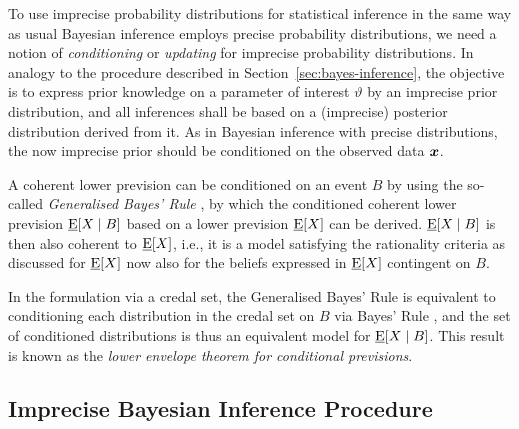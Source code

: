 To use imprecise probability distributions for statistical inference
in the same way as usual Bayesian inference employs precise probability distributions,
we need a notion of \emph{conditioning} or \emph{updating} for imprecise probability distributions.
In analogy to the procedure described in Section~\ref{sec:bayes-inference},
the objective is to express prior knowledge on a parameter of interest $\vartheta$
by an imprecise prior distribution,
and all inferences shall be based on a (imprecise) posterior distribution derived from it.
As in Bayesian inference with precise distributions,
the now imprecise prior should be conditioned on the observed data ${\bm x}$.

A coherent lower prevision can be conditioned on an event $B$
by using the so-called \emph{Generalised Bayes' Rule} \parencite[\S 6.4]{1991:walley},
by which the conditioned coherent lower prevision $\underline{\operatorname{E}}[X\mid B]$
based on a lower prevision $\underline{\operatorname{E}}[X]$ can be derived.
$\underline{\operatorname{E}}[X\mid B]$ is then also coherent to $\underline{\operatorname{E}}[X]$, i.e.,
it is a model satisfying the rationality criteria as discussed for $\underline{\operatorname{E}}[X]$
now also for the beliefs expressed in $\underline{\operatorname{E}}[X]$ contingent on $B$.

In the formulation via a credal set, the Generalised Bayes' Rule
is equivalent to conditioning each distribution in the credal set on $B$ via Bayes' Rule
\parencite[\S 6.4.2]{1991:walley},
and the set of conditioned distributions is thus an equivalent model for $\underline{\operatorname{E}}[X\mid B]$.
This result is known as the \emph{lower envelope theorem for conditional previsions}.


\subsection{Imprecise Bayesian Inference Procedure}
\label{sec:imprecisebayes}


